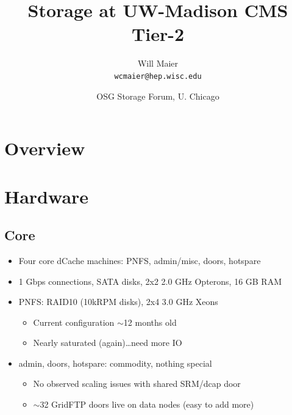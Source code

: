 \documentclass{beamer}
\title{Storage at UW-Madison CMS Tier-2}
\author[Maier]{
    Will Maier \\ 
    {\tt wcmaier@hep.wisc.edu}}
\institute[Wisconsin]{University of Wisconsin - High Energy Physics}
\date[2010.09.22]{OSG Storage Forum, U. Chicago}
\newcommand{\ca}{\ensuremath{\sim}}
\begin{document}

\begin{frame}
    \titlepage
\end{frame}

\section{Overview}
\begin{frame}
    \tableofcontents
\end{frame}

\section{Hardware}
\subsection{Core}
\begin{frame}
\begin{itemize}
	\item Four core dCache machines: PNFS, admin/misc, doors, hotspare
	\item 1 Gbps connections, SATA disks, 2x2 2.0 GHz Opterons, 16 GB RAM
	\item PNFS: RAID10 (10kRPM disks), 2x4 3.0 GHz Xeons
	\begin{itemize}
		\item Current configuration \ca{}12 months old
		\item Nearly saturated (again)\ldots{}need more IO
	\end{itemize}
	\item admin, doors, hotspare: commodity, nothing special
	\begin{itemize}
		\item No observed scaling issues with shared SRM/dcap door
		\item \ca{}32 GridFTP doors live on data nodes (easy to add more)
	\end{itemize}
\end{itemize}
\end{frame}
\end{document}
